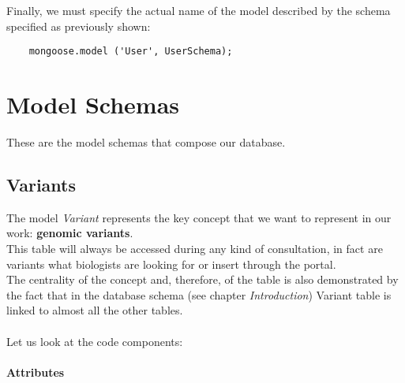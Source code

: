 Finally, we must specify the actual name of the model described by the schema specified as previously shown:

\begin{lstlisting}
	mongoose.model ('User', UserSchema);
\end{lstlisting}


\section{Model Schemas}
These are the model schemas that compose our database.


\subsection{Variants}
The model \emph{Variant} represents the key concept that we want to represent in our work: \textbf{genomic variants}.
\\This table will always be accessed during any kind of consultation, in fact are variants what biologists are looking for or insert through the portal.
\\The centrality of the concept and, therefore, of the table is also demonstrated by the fact that in the database schema (see chapter \emph{Introduction}) Variant table is linked to almost all the other tables.
\\
\\Let us look at the code components:

\newpage

\paragraph{Attributes}      

